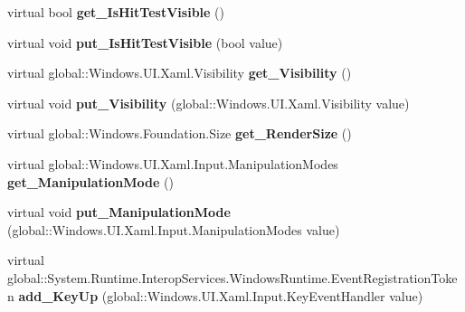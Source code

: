 \begin{DoxyCompactItemize}
virtual bool {\bfseries get\+\_\+\+Is\+Hit\+Test\+Visible} ()
\item 
\mbox{\label{class_windows_1_1_u_i_1_1_xaml_1_1_u_i_element_a91c0826f6d39080d6e6c6bca0144cdb1}} 
virtual void {\bfseries put\+\_\+\+Is\+Hit\+Test\+Visible} (bool value)
\item 
\mbox{\label{class_windows_1_1_u_i_1_1_xaml_1_1_u_i_element_a28fb7dc5ba5e68bbf934a134e97777f2}} 
virtual global\+::\+Windows.\+U\+I.\+Xaml.\+Visibility {\bfseries get\+\_\+\+Visibility} ()
\item 
\mbox{\label{class_windows_1_1_u_i_1_1_xaml_1_1_u_i_element_aa21b9a45ef782cd5fe687bf2ad1b542a}} 
virtual void {\bfseries put\+\_\+\+Visibility} (global\+::\+Windows.\+U\+I.\+Xaml.\+Visibility value)
\item 
\mbox{\label{class_windows_1_1_u_i_1_1_xaml_1_1_u_i_element_ae8754f086fb49dc408bd75c4277a1aaa}} 
virtual global\+::\+Windows.\+Foundation.\+Size {\bfseries get\+\_\+\+Render\+Size} ()
\item 
\mbox{\label{class_windows_1_1_u_i_1_1_xaml_1_1_u_i_element_a144176607f6318a776be9a5bd0836be5}} 
virtual global\+::\+Windows.\+U\+I.\+Xaml.\+Input.\+Manipulation\+Modes {\bfseries get\+\_\+\+Manipulation\+Mode} ()
\item 
\mbox{\label{class_windows_1_1_u_i_1_1_xaml_1_1_u_i_element_a2d57a47a49d348fcb616d78e70fbb023}} 
virtual void {\bfseries put\+\_\+\+Manipulation\+Mode} (global\+::\+Windows.\+U\+I.\+Xaml.\+Input.\+Manipulation\+Modes value)
\item 
\mbox{\label{class_windows_1_1_u_i_1_1_xaml_1_1_u_i_element_ae3fbd9d6083ca5ff6d54b03c98f3ddd0}} 
virtual global\+::\+System.\+Runtime.\+Interop\+Services.\+Windows\+Runtime.\+Event\+Registration\+Token {\bfseries add\+\_\+\+Key\+Up} (global\+::\+Windows.\+U\+I.\+Xaml.\+Input.\+Key\+Event\+Handler value)
\item 
\mbox{\label{class_windows_1_1_u_i_1_1_xaml_1_1_u_i_element_a9b0df5770c1290041beafa550462cc33}} 

\end{DoxyCompactItemize}
